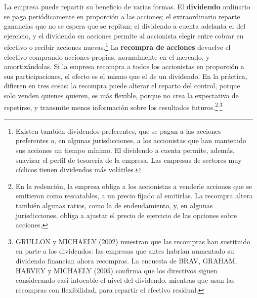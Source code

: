 \documentclass[10pt,a4paper]{article}
\begin{document}
La empresa puede repartir su beneficio de varias formas. El \textbf{dividendo} ordinario se paga periódicamente en proporción a las acciones; el extraordinario reparte ganancias que no se espera que se repitan; el dividendo a cuenta adelanta el del ejercicio, y el dividendo en acciones permite al accionista elegir entre cobrar en efectivo o recibir acciones nuevas.\footnote{%
    Existen también dividendos preferentes, que se pagan a las acciones preferentes o, en algunas jurisdicciones, a los accionistas que han mantenido sus acciones un tiempo mínimo. El dividendo a cuenta permite, además, suavizar el perfil de tesorería de la empresa. Las empresas de sectores muy cíclicos tienen dividendos más volátiles.
} La \textbf{recompra de acciones} devuelve el efectivo comprando acciones propias, normalmente en el mercado, y amortizándolas. Si la empresa recompra a todos los accionistas en proporción a sus participaciones, el efecto es el mismo que el de un dividendo. En la práctica, difieren en tres cosas: la recompra puede alterar el reparto del control, porque solo venden quienes quieren, es más flexible, porque no crea la expectativa de repetirse, y transmite menos información sobre los resultados futuros.\footnote{%
    En la redención, la empresa obliga a los accionistas a venderle acciones que se emitieron como rescatables, a un precio fijado al emitirlas. La recompra altera también algunas ratios, como la de endeudamiento, y, en algunas jurisdicciones, obliga a ajustar el precio de ejercicio de las opciones sobre acciones.
}\textsuperscript{,}\footnote{%
    GRULLON y MICHAELY (2002) muestran que las recompras han sustituido en parte a los dividendos: las empresas que antes habrían aumentado su dividendo financian ahora recompras. La encuesta de BRAV, GRAHAM, HARVEY y MICHAELY (2005) confirma que los directivos siguen considerando casi intocable el nivel del dividendo, mientras que usan las recompras con flexibilidad, para repartir el efectivo residual.
}
\end{document}

